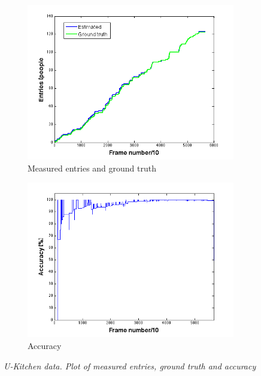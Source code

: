 \begin{figure}[H]
\centering
\begin{subfigure}{.5\textwidth}
  \centering
  \includegraphics[width=1.1\linewidth]{images/entriesGTU.png}
  \caption{Measured entries and ground truth}
  \label{fig:sub1}
\end{subfigure}%
\begin{subfigure}{.5\textwidth}
  \centering
  \includegraphics[width=1.1\linewidth]{images/accInU.png}
  \caption{Accuracy}
  \label{fig:sub2}
\end{subfigure}
\caption[U-kitchen entries]{\textit{U-Kitchen data. Plot of measured entries, ground truth and accuracy}}
\label{fig:U-kitchen entries}
\end{figure}

